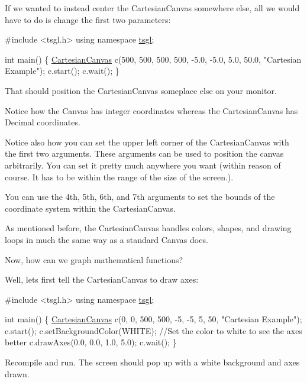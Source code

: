 If we wanted to instead center the Cartesian\+Canvas somewhere else, all we would have to do is change the first two parameters\+:


\begin{DoxyCode}
\textcolor{preprocessor}{#include <tsgl.h>}
\textcolor{keyword}{using namespace }\hyperlink{namespacetsgl}{tsgl};

\textcolor{keywordtype}{int} main() \{
  \hyperlink{classtsgl_1_1_cartesian_canvas}{CartesianCanvas} c(500, 500, 500, 500, -5.0, -5.0, 5.0, 50.0, \textcolor{stringliteral}{"Cartesian Example"});
  c.start();
  c.wait();
\}
\end{DoxyCode}


That should position the Cartesian\+Canvas someplace else on your monitor.

Notice how the Canvas has integer coordinates whereas the Cartesian\+Canvas has Decimal coordinates.

Notice also how you can set the upper left corner of the Cartesian\+Canvas with the first two arguments. These arguments can be used to position the canvas arbitrarily. You can set it pretty much anywhere you want (within reason of course. It has to be within the range of the size of the screen.).

You can use the 4th, 5th, 6th, and 7th arguments to set the bounds of the coordinate system within the Cartesian\+Canvas.

As mentioned before, the Cartesian\+Canvas handles colors, shapes, and drawing loops in much the same way as a standard Canvas does.

Now, how can we graph mathematical functions?

Well, let\textquotesingle{}s first tell the Cartesian\+Canvas to draw axes\+:


\begin{DoxyCode}
\textcolor{preprocessor}{#include <tsgl.h>}
\textcolor{keyword}{using namespace }\hyperlink{namespacetsgl}{tsgl};

\textcolor{keywordtype}{int} main() \{
  \hyperlink{classtsgl_1_1_cartesian_canvas}{CartesianCanvas} c(0, 0, 500, 500, -5, -5, 5, 50, \textcolor{stringliteral}{"Cartesian Example"});
  c.start();
  c.setBackgroundColor(WHITE);  \textcolor{comment}{//Set the color to white to see the axes better}
  c.drawAxes(0.0, 0.0, 1.0, 5.0);
  c.wait();
\}
\end{DoxyCode}


Recompile and run. The screen should pop up with a white background and axes drawn.

